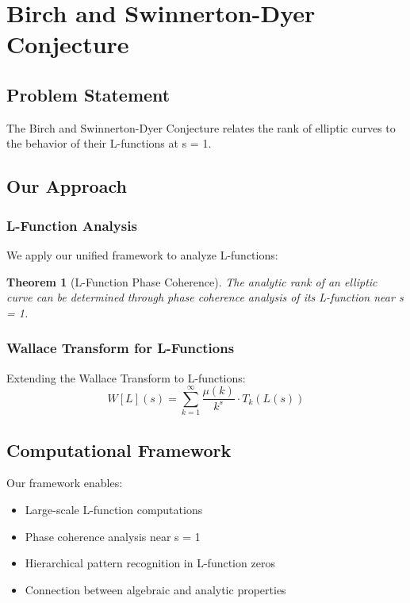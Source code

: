 \documentclass[12pt]{article}
\newtheorem{theorem}{Theorem}
\begin{document}
\section{Birch and Swinnerton-Dyer Conjecture}

\subsection{Problem Statement}
The Birch and Swinnerton-Dyer Conjecture relates the rank of elliptic curves to the behavior of their L-functions at s = 1.

\subsection{Our Approach}

\subsubsection{L-Function Analysis}

We apply our unified framework to analyze L-functions:

\begin{theorem}[L-Function Phase Coherence]
The analytic rank of an elliptic curve can be determined through phase coherence analysis of its L-function near s = 1.
\end{theorem}

\subsubsection{Wallace Transform for L-Functions}

Extending the Wallace Transform to L-functions:
\begin{equation}
W[L](s) = \sum_{k=1}^{\infty} \frac{\mu(k)}{k^s} \cdot T_k(L(s))
\end{equation}

\subsection{Computational Framework}

Our framework enables:
\begin{itemize}
    \item Large-scale L-function computations
    \item Phase coherence analysis near s = 1
    \item Hierarchical pattern recognition in L-function zeros
    \item Connection between algebraic and analytic properties
\end{itemize}
\end{document}
